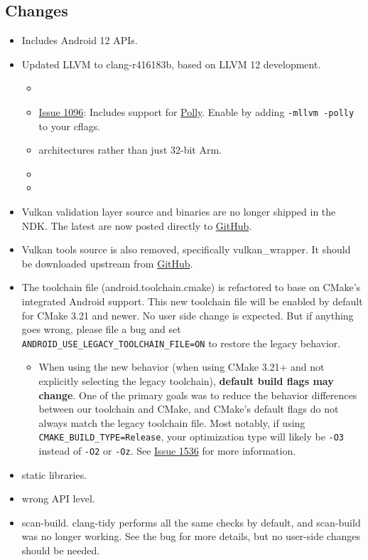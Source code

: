 \hypertarget{changes}{%
\subsection{Changes}\label{changes}}

\begin{itemize}
\tightlist
\item
  Includes Android 12 APIs.
\item
  Updated LLVM to clang-r416183b, based on LLVM 12 development.

  \begin{itemize}
  \tightlist
  \item
  \item
    \href{https://github.com/android/ndk/issues/1134}{Issue 1096}:
    Includes support for \href{https://polly.llvm.org/}{Polly}. Enable
    by adding \texttt{-mllvm\ -polly} to your cflags.
  \item
    architectures rather than just 32-bit Arm.
  \item
  \item
  \end{itemize}
\item
  Vulkan validation layer source and binaries are no longer shipped in
  the NDK. The latest are now posted directly to
  \href{https://github.com/KhronosGroup/Vulkan-ValidationLayers/releases}{GitHub}.
\item
  Vulkan tools source is also removed, specifically vulkan\_wrapper. It
  should be downloaded upstream from
  \href{https://github.com/KhronosGroup/output}{GitHub}.
\item
  The toolchain file (android.toolchain.cmake) is refactored to base on
  CMake's integrated Android support. This new toolchain file will be
  enabled by default for CMake 3.21 and newer. No user side change is
  expected. But if anything goes wrong, please file a bug and set
  \texttt{ANDROID\_USE\_LEGACY\_TOOLCHAIN\_FILE=ON} to restore the
  legacy behavior.

  \begin{itemize}
  \tightlist
  \item
    When using the new behavior (when using CMake 3.21+ and not
    explicitly selecting the legacy toolchain), \textbf{default build
    flags may change}. One of the primary goals was to reduce the
    behavior differences between our toolchain and CMake, and CMake's
    default flags do not always match the legacy toolchain file. Most
    notably, if using \texttt{CMAKE\_BUILD\_TYPE=Release}, your
    optimization type will likely be \texttt{-O3} instead of
    \texttt{-O2} or \texttt{-Oz}. See
    \href{https://github.com/android/ndk/issues/1536}{Issue 1536} for
    more information.
  \end{itemize}
\item
  static libraries.
\item
  wrong API level.
\item
  scan-build. clang-tidy performs all the same checks by default, and
  scan-build was no longer working. See the bug for more details, but no
  user-side changes should be needed.
\end{itemize}

